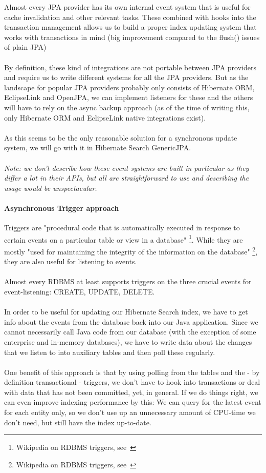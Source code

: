 Almost every JPA provider has its own internal event system that is useful for cache invalidation and other relevant tasks. These combined with hooks into the transaction management allows us to build a proper index updating system that works with transactions in mind (big improvement compared to the flush() issues of plain JPA)
\\\\
By definition, these kind of integrations are not portable between JPA providers and require us to write different systems for all the JPA providers. But as the landscape for popular JPA providers probably only consists of Hibernate ORM, EclipseLink and OpenJPA, we can implement listeners for these and the others will have to rely on the async backup approach (as of the time of writing this, only Hibernate ORM and EclipseLink native integrations exist).
\\\\
As this seems to be the only reasonable solution for a synchronous update system, we will go with it in Hibernate Search GenericJPA.
\\\\
\textit{Note: we don't describe how these event systems are built in particular as they differ a lot in their APIs, but all are straightforward to use and describing the usage would be unspectacular.}

\paragraph{Asynchronous Trigger approach}
Triggers are "procedural code that is automatically executed in response to certain events on a particular table or view in a database" \footnote{Wikipedia on RDBMS triggers, see~\cite{triggers_wiki}}. While they are mostly "used for maintaining the integrity of the information on the database" \footnote{Wikipedia on RDBMS triggers, see~\cite{triggers_wiki}}, they are also useful for listening to events.
\\\\
Almost every RDBMS at least supports triggers on the three crucial events for event-listening: CREATE, UPDATE, DELETE.
\\\\
In order to be useful for updating our Hibernate Search index, we have to get info about the events from the database back into our Java application. Since we cannot necessarily call Java code from our database (with the exception of some enterprise and in-memory databases), we have to write data about the changes that we listen to into auxiliary tables and then poll these regularly.
\\\\
One benefit of this approach is that by using polling from the tables and the - by definition transactional - triggers, we don't have to hook into transactions or deal with data that has not been committed, yet, in general. If we do things right, we can even improve indexing performance by this: We can query for the latest event for each entity only, so we don't use up an unnecessary amount of CPU-time we don't need, but still have the index up-to-date.

